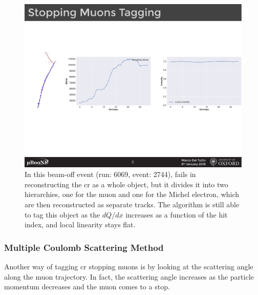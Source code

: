 \begin{figure}[]
\centering
\includegraphics[width=.99\textwidth]{images/StoppingMuonTagger/stopmu_tagger_ev6069_54_2744}
\caption[$dQ/dx$ and Linearity for a Cosmic Ray Stoping Muon]{In this beam-off event (run: 6069, event: 2744), \pc fails in reconstructing the \acrshort{cr} as a whole object, but it divides it into two hierarchies, one for the muon and one for the Michel electron, which are then reconstructed as separate tracks. The algorithm is still able to tag this object as the $dQ/dx$ increases as a function of the hit index, and local linearity stays flat.}
\label{fig:stopmu_tagger_ev6069_54_2744}
\end{figure}



\subsubsection{Multiple Coulomb Scattering Method}

Another way of tagging \acrshort{cr} stopping muons is by looking at the scattering angle along the muon trajectory. In fact, the scattering angle increases as the particle momentum decreases and the muon comes to a stop. 

